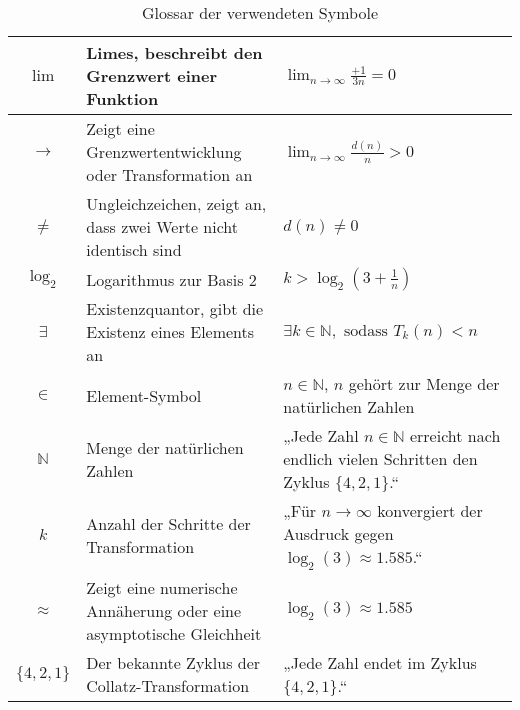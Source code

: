 \documentclass[a4paper,12pt]{article}
\begin{document}
\begin{table}[h!]
\begin{tabular}{|c|p{7cm}|p{5cm}|}
    \( \lim \) & Limes, beschreibt den Grenzwert einer Funktion & \( \lim_{n \to \infty} \frac{+1}{3n} = 0 \) \\ \hline
    \( \to \) & Zeigt eine Grenzwertentwicklung oder Transformation an & \( \lim_{n \to \infty} \frac{d(n)}{n} > 0 \) \\ \hline
    \( \neq \) & Ungleichzeichen, zeigt an, dass zwei Werte nicht identisch sind & \( d(n) \neq 0 \) \\ \hline
    \( \log_2 \) & Logarithmus zur Basis 2 & \( k > \log_2(3 + \frac{1}{n}) \) \\ \hline
    \( \exists \) & Existenzquantor, gibt die Existenz eines Elements an & \( \exists k \in \mathbb{N}, \text{ sodass } T_k(n) < n \) \\ \hline
    \( \in \) & Element-Symbol & \( n \in \mathbb{N} \), \( n \) gehört zur Menge der natürlichen Zahlen \\ \hline
    \( \mathbb{N} \) & Menge der natürlichen Zahlen & „Jede Zahl \( n \in \mathbb{N} \) erreicht nach endlich vielen Schritten den Zyklus \( \{4, 2, 1\} \).“ \\ \hline
    \( k \) & Anzahl der Schritte der Transformation & „Für \( n \to \infty \) konvergiert der Ausdruck gegen \( \log_2(3) \approx 1.585 \).“ \\ \hline
    \( \approx \) & Zeigt eine numerische Annäherung oder eine asymptotische Gleichheit & \( \log_2(3) \approx 1.585 \) \\ \hline
    \( \{4, 2, 1\} \) & Der bekannte Zyklus der Collatz-Transformation & „Jede Zahl endet im Zyklus \( \{4, 2, 1\} \).“ \\ \hline
    \end{tabular}
    \caption{Glossar der verwendeten Symbole}
    \label{tab:glossar}
\end{table}
\end{document}
